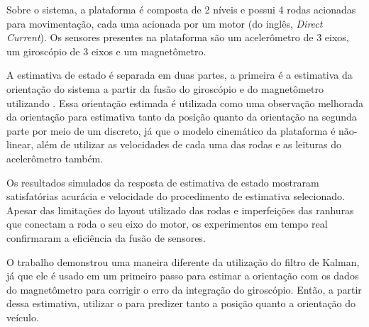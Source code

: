 \documentclass[acronym, symbols, table]{fei}
\begin{document}
Sobre o sistema, a plataforma é composta de 2 níveis e possui 4 rodas acionadas para movimentação, cada uma acionada por um motor  (do inglês, \textit{Direct Current}). Os sensores presentes na plataforma são um acelerômetro de 3 eixos, um giroscópio de 3 eixos e um magnetômetro.

A estimativa de estado é separada em duas partes, a primeira é a estimativa da orientação do sistema a partir da fusão do giroscópio e do magnetômetro utilizando . Essa orientação estimada é utilizada como uma observação melhorada da orientação para estimativa tanto da posição quanto da orientação na segunda parte por meio de um  discreto, já que o modelo cinemático da plataforma é não-linear, além de utilizar as velocidades de cada uma das rodas e as leituras do acelerômetro também.

Os resultados simulados da resposta de estimativa de estado mostraram satisfatórias acurácia e velocidade do procedimento de estimativa selecionado. Apesar das limitações do layout utilizado das rodas e imperfeições das ranhuras que conectam a roda o seu eixo do motor, os experimentos em tempo real confirmaram a eficiência da fusão de sensores.

O trabalho demonstrou uma maneira diferente da utilização do filtro de Kalman, já que ele é usado em um primeiro passo para estimar a orientação com os dados do magnetômetro para corrigir o erro da integração do giroscópio. Então, a partir dessa estimativa, utilizar o  para predizer tanto a posição quanto a orientação do veículo.

%	
\end{document}
